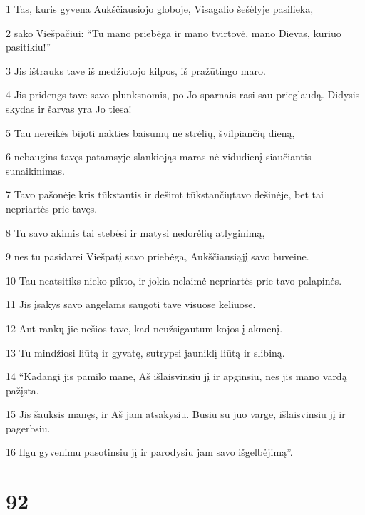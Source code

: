 \par 1 Tas, kuris gyvena Aukščiausiojo globoje, Visagalio šešėlyje pasilieka, 
\par 2 sako Viešpačiui: “Tu mano priebėga ir mano tvirtovė, mano Dievas, kuriuo pasitikiu!” 
\par 3 Jis ištrauks tave iš medžiotojo kilpos, iš pražūtingo maro. 
\par 4 Jis pridengs tave savo plunksnomis, po Jo sparnais rasi sau prieglaudą. Didysis skydas ir šarvas yra Jo tiesa! 
\par 5 Tau nereikės bijoti nakties baisumų nė strėlių, švilpiančių dieną, 
\par 6 nebaugins tavęs patamsyje slankiojąs maras nė vidudienį siaučiantis sunaikinimas. 
\par 7 Tavo pašonėje kris tūkstantis ir dešimt tūkstančių­tavo dešinėje, bet tai nepriartės prie tavęs. 
\par 8 Tu savo akimis tai stebėsi ir matysi nedorėlių atlyginimą, 
\par 9 nes tu pasidarei Viešpatį savo priebėga, Aukščiausiąjį savo buveine. 
\par 10 Tau neatsitiks nieko pikto, ir jokia nelaimė nepriartės prie tavo palapinės. 
\par 11 Jis įsakys savo angelams saugoti tave visuose keliuose. 
\par 12 Ant rankų jie nešios tave, kad neužsigautum kojos į akmenį. 
\par 13 Tu mindžiosi liūtą ir gyvatę, sutrypsi jauniklį liūtą ir slibiną. 
\par 14 “Kadangi jis pamilo mane, Aš išlaisvinsiu jį ir apginsiu, nes jis mano vardą pažįsta. 
\par 15 Jis šauksis manęs, ir Aš jam atsakysiu. Būsiu su juo varge, išlaisvinsiu jį ir pagerbsiu. 
\par 16 Ilgu gyvenimu pasotinsiu jį ir parodysiu jam savo išgelbėjimą”.


\chapter{92}


